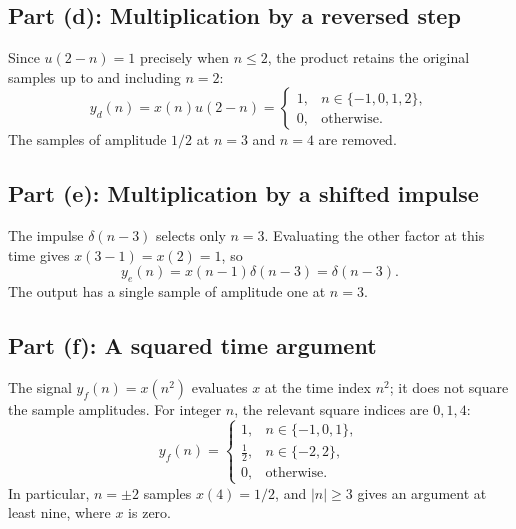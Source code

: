 \subsection{Part (d): Multiplication by a reversed step}
Since $u(2-n)=1$ precisely when $n\leq2$, the product retains the
original samples up to and including $n=2$:
\begin{equation}
  y_d(n)=x(n)u(2-n)=\begin{cases}
    1, & n\in\{-1,0,1,2\},\\
    0, & \text{otherwise}.
  \end{cases}
\end{equation}
The samples of amplitude $1/2$ at $n=3$ and $n=4$ are removed.

\subsection{Part (e): Multiplication by a shifted impulse}
The impulse $\delta(n-3)$ selects only $n=3$. Evaluating the other
factor at this time gives $x(3-1)=x(2)=1$, so
\begin{equation}
  y_e(n)=x(n-1)\delta(n-3)=\delta(n-3).
\end{equation}
The output has a single sample of amplitude one at $n=3$.

\subsection{Part (f): A squared time argument}
The signal $y_f(n)=x(n^2)$ evaluates $x$ at the time index $n^2$;
it does not square the sample amplitudes. For integer $n$, the relevant
square indices are $0,1,4$:
\begin{equation}
  y_f(n)=\begin{cases}
    1, & n\in\{-1,0,1\},\\
    \tfrac12, & n\in\{-2,2\},\\
    0, & \text{otherwise}.
  \end{cases}
\end{equation}
In particular, $n=\pm2$ samples $x(4)=1/2$, and $|n|\geq3$ gives
an argument at least nine, where $x$ is zero.

